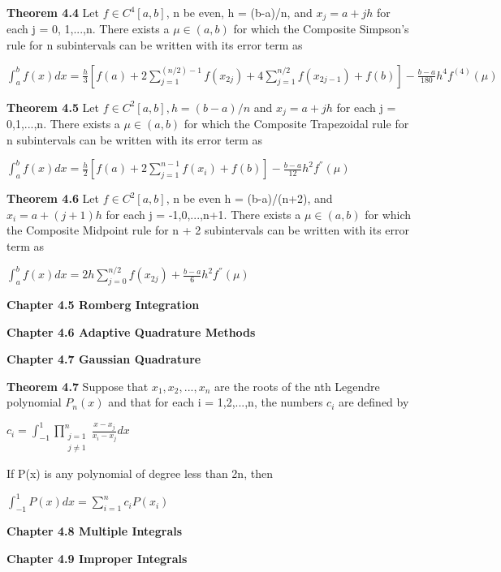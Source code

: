 \documentclass{article}
\begin{document}
\textbf {Theorem 4.4} Let $f \in C^4[a,b]$, n be even, h = (b-a)/n, and $x_j = a + jh$ for each j = 0, 1,...,n. There exists a $\mu \in (a,b)$ for which the Composite Simpson's rule for n subintervals can be written with its error term as
\begin{center}
$\int_a^b f(x) dx = \frac{h}{3}
[
f(a)  + 2 \sum_{j=1}^{(n/2)-1}  f(x_{2j}) + 4 \sum_{j=1}^{n/2}  f(x_{2j-1}) + f(b)
]
- \frac{b-a}{180} h^4 f^{(4)} (\mu)$
\end{center}

\textbf {Theorem 4.5} Let $f \in C^2 [a,b], h = (b-a)/n$ and $x_j = a + jh$ for each j = 0,1,...,n. There exists a $\mu \in (a,b)$ for which the Composite Trapezoidal rule for n subintervals can be written with its error term as
\begin{center}
$\int_a^b f(x) dx = \frac{h}{2} [f(a) + 2 \sum_{j=1}^{n-1} f(x_i) + f(b)] - \frac{b-a}{12} h^2 f^{''} (\mu)$
\end{center}

\textbf {Theorem 4.6} Let $f \in C^2 [a,b]$, n be even h = (b-a)/(n+2), and $x_i = a + (j+1)h$ for each j = -1,0,...,n+1. There exists a $\mu \in (a,b)$ for which the Composite Midpoint rule for n + 2 subintervals can be written with its error term as
\begin{center}
$\int_a^b f(x) dx = 2h \sum_{j=0}^{n/2} f(x_{2j}) + \frac{b-a}{6} h^2 f^{''} (\mu)$
\end{center}

\textbf {Chapter 4.5 Romberg Integration}

\textbf {Chapter 4.6 Adaptive Quadrature Methods}

\textbf {Chapter 4.7 Gaussian Quadrature}

\textbf {Theorem 4.7} Suppose that $x_1, x_2,..., x_n$ are the roots of the nth Legendre polynomial $P_n(x)$ and that for each i = 1,2,...,n, the numbers $c_i$ are defined by
\begin{center}
$c_i = \int_{-1}^1 {\prod_{\substack {j=1 \\ j \neq 1}}^n} \frac{x-x_j}{x_i - x_j} dx$
\end{center}

If P(x) is any polynomial of degree less than 2n, then 
\begin{center}
$\int_{-1}^1 P(x) dx = \sum_{i = 1}^n c_i P(x_i)$
\end{center}

\textbf {Chapter 4.8 Multiple Integrals}

\textbf {Chapter 4.9 Improper Integrals}
\end{document}
